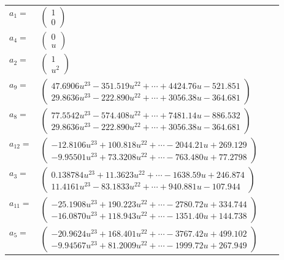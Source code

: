 \documentclass[1p]{elsarticle_modified}
\theoremstyle{definition}
\begin{document}
\begin{tabular}{m{7pt} m{180pt} m{7pt} m{180pt} }
\flushright $a_{1}=$&$\begin{pmatrix}1\\0\end{pmatrix}$ \\
\flushright $a_{4}=$&$\begin{pmatrix}0\\u\end{pmatrix}$ \\
\flushright $a_{2}=$&$\begin{pmatrix}1\\u^2\end{pmatrix}$ \\
\flushright $a_{9}=$&$\begin{pmatrix}47.6906 u^{23}-351.519 u^{22}+\cdots+4424.76 u-521.851\\29.8636 u^{23}-222.890 u^{22}+\cdots+3056.38 u-364.681\end{pmatrix}$ \\
\flushright $a_{8}=$&$\begin{pmatrix}77.5542 u^{23}-574.408 u^{22}+\cdots+7481.14 u-886.532\\29.8636 u^{23}-222.890 u^{22}+\cdots+3056.38 u-364.681\end{pmatrix}$ \\
\flushright $a_{12}=$&$\begin{pmatrix}-12.8106 u^{23}+100.818 u^{22}+\cdots-2044.21 u+269.129\\-9.95501 u^{23}+73.3208 u^{22}+\cdots-763.480 u+77.2798\end{pmatrix}$ \\
\flushright $a_{3}=$&$\begin{pmatrix}0.138784 u^{23}+11.3623 u^{22}+\cdots-1638.59 u+246.874\\11.4161 u^{23}-83.1833 u^{22}+\cdots+940.881 u-107.944\end{pmatrix}$ \\
\flushright $a_{11}=$&$\begin{pmatrix}-25.1908 u^{23}+190.223 u^{22}+\cdots-2780.72 u+334.744\\-16.0870 u^{23}+118.943 u^{22}+\cdots-1351.40 u+144.738\end{pmatrix}$ \\
\flushright $a_{5}=$&$\begin{pmatrix}-20.9624 u^{23}+168.401 u^{22}+\cdots-3767.42 u+499.102\\-9.94567 u^{23}+81.2009 u^{22}+\cdots-1999.72 u+267.949\end{pmatrix}$ \\

\end{tabular}
\end{document}
